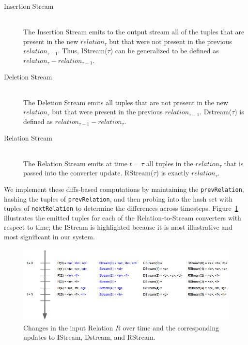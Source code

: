 \documentclass[a4paper, 10pt, conference]{IEEEconf}
\begin{document}
\begin{description}
    \item[Insertion Stream] \hfill \\
    The Insertion Stream emits to the output stream all of the tuples that are present in the new $relation_{\tau}$ but that were not present in the previous $relation_{\tau - 1}$. Thus, IStream($\tau$) can be generalized to be defined as $relation_{\tau} -relation_{\tau - 1}$.

    \item[Deletion Stream] \hfill \\
    The Deletion Stream emits all tuples that are not present in the new $relation_{\tau}$ but that were present in the previous $relation_{\tau - 1}$. Dstream($\tau$) is defined as $relation_{\tau - 1} - relation_{\tau}$.

    \item[Relation Stream] \hfill \\
    The Relation Stream emits at time $t = \tau$ all tuples in the $relation_{\tau}$ that is passed into the converter update. RStream($\tau$) is exactly $relation_{\tau}$.

\end{description}


We implement these diffs-based computations by maintaining the \texttt{prevRelation}, hashing the tuples of \texttt{prevRelation}, and then probing into the hash set with tuples of \texttt{nextRelation} to determine the differences across timesteps. Figure~\ref{fig:stream_converter} illustrates the emitted tuples for each of the Relation-to-Stream converters with respect to time; the IStream is highlighted because it is most illustrative and most significant in our system. 

\begin{figure}[h!]
    \centering
    \centerline{\includegraphics[totalheight=3cm]{stream_converter.png}}
    \caption{Changes in the input Relation $R$ over time and the corresponding updates to IStream, Dstream, and RStream.}
    \label{fig:stream_converter}
\end{figure}
\end{document}
